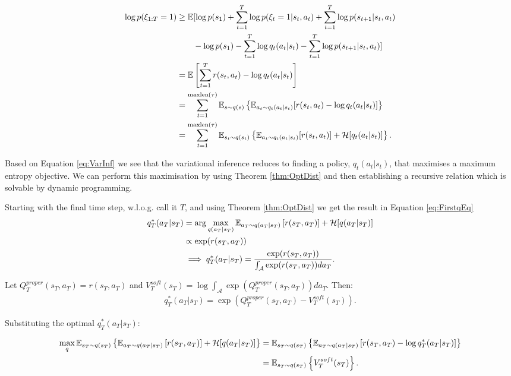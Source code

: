 \documentclass{report}
\numberwithin{equation}{section}
\numberwithin{figure}{section}
\numberwithin{table}{section}
\numberwithin{algorithm}{section}
\begin{document}
\begin{align}\label{eq:VarInf}
  \log p(\xi_{1:T}=1)&\ge \mathbb{E}[
    \log p(s_1) + \sum_{t=1}^T \log p(\xi_t=1|s_t,a_t) + \sum_{t=1}^T \log p(s_{t+1}|s_t,a_t)\\
    & \qquad -\log p(s_1) - \sum_{t=1}^T \log q_t(a_t|s_t) -  \sum_{t=1}^T \log p(s_{t+1}|s_t,a_t)
  ]\notag\\
&=\mathbb{E}\left[
  \sum_{t=1}^T r(s_t,a_t) - \log q_t(a_t|s_t)
\right]\notag\\
&=\sum_{t=1}^{\text{maxlen}(\tau)} \mathbb{E}_{s\sim q(s)}\left\{
  \mathbb{E}_{a_t\sim q_t(a_t|s_t)}[r(s_t,a_t) - \log q_t(a_t|s_t)]\right\}\notag\\
&=\sum_{t=1}^{\text{maxlen}(\tau)} \mathbb{E}_{s_t\sim q(s_t)}\left\{
  \mathbb{E}_{a_t\sim q_t(a_t|s_t)}[r(s_t,a_t)] + \mathcal{H}[q_t(a_t|s_t)]\right\}.
\end{align}

Based on Equation \ref{eq:VarInf} we see that the variational inference 
reduces to finding a policy, $q_t(a_t|s_t)$, that maximises a maximum 
entropy objective. We can perform this maximisation by using 
Theorem \ref{thm:OptDist} and then establishing a recursive 
relation which is solvable by dynamic programming.

Starting with the final time step, w.l.o.g. call it $T$, and 
using Theorem \ref{thm:OptDist} we get the result in Equation 
\ref{eq:FirstqEq}
\begin{align}\label{eq:FirstqEq}
  q_T^*(a_T|s_T)&=\arg \max_{q(a_T|s_T)} \mathbb{E}_{a_T\sim q(a_T|s_T)}\left[
    r(s_T, a_T)
  \right] + \mathcal{H}[q(a_T|s_T)]\notag\\
  &\propto \exp(r(s_T,a_T))\notag\\
  &\implies q_T^*(a_T|s_T)=\frac{\exp(r(s_T,a_T))}{\int_{\mathcal{A}}\exp(r(s_T,a_T))da_T}.
\end{align}

Let $Q^{proper}_T(s_T,a_T)=r(s_T,a_T)$ and 
$V^{soft}_T(s_T)=\log\int_{\mathcal{A}}\exp(Q^{proper}_T(s_T,a_T))da_T$. 
Then: 
\begin{eqnarray*}
  q_T^*(a_T|s_T)=\exp(Q^{proper}_T(s_T,a_T)-V^{soft}_T(s_T)). 
\end{eqnarray*}

Substituting the optimal $q^*_T(a_T|s_T)$:

\begin{align*}
  \max_{q} \mathbb{E}_{s_T\sim q(s_T)}\left\{\mathbb{E}_{a_T\sim q(a_T|s_T)}\left[
    r(s_T, a_T)
  \right] + \mathcal{H}[q(a_T|s_T)]
  \right\}&=\mathbb{E}_{s_T\sim q(s_T)}\left\{
    \mathbb{E}_{a_T\sim q(a_T|s_T)}\left[
    r(s_T, a_T)
   -\log q^*_T(a_T|s_T)\right]\right\}\notag\\
   &=\mathbb{E}_{s_T\sim q(s_T)}\left\{
    V^{soft}_T(s_T)\right\}.
\end{align*}
\end{document}

